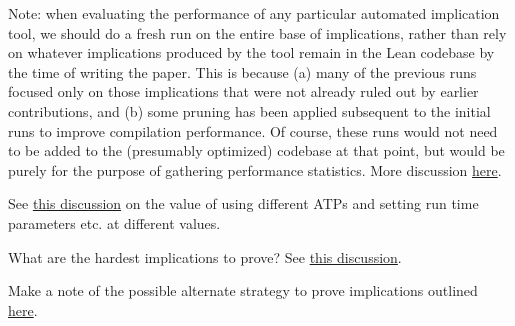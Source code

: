 Note: when evaluating the performance of any particular automated implication tool, we should do a fresh run on the entire base of implications, rather than rely on whatever implications produced by the tool remain in the Lean codebase by the time of writing the paper. This is because (a) many of the previous runs focused only on those implications that were not already ruled out by earlier contributions, and (b) some pruning has been applied subsequent to the initial runs to improve compilation performance. Of course, these runs would not need to be added to the (presumably optimized) codebase at that point, but would be purely for the purpose of gathering performance statistics. More discussion \href{https://leanprover.zulipchat.com/#narrow/stream/458659-Equational/topic/RECORDS.20REQUEST.3A.20data.20and.20performance.20automated.20run.20metrics}{here}.

See \href{https://leanprover.zulipchat.com/#narrow/channel/458659-Equational/topic/1516.20-.3E.20255/near/481547543}{this discussion} on the value of using different ATPs and setting run time parameters etc. at different values.

What are the hardest implications to prove?  See \href{https://leanprover.zulipchat.com/#narrow/channel/458659-Equational/topic/What.20are.20the.20hardest.20positive.20implications.20for.20an.20ATP.3F}{this discussion}.

Make a note of the possible alternate strategy to prove implications outlined \href{https://leanprover.zulipchat.com/#narrow/stream/458659-Equational/topic/Ideas.20for.20unknown.20implications}{here}.
